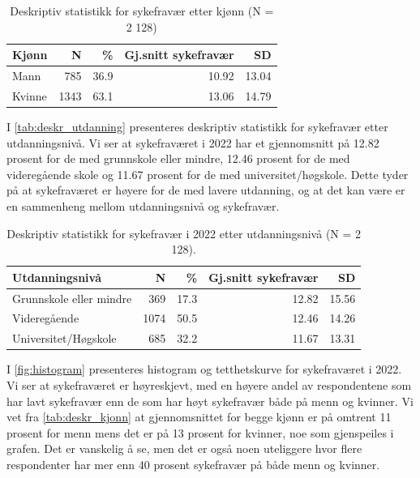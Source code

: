 \documentclass[
  12pt,
  a4paper,
  DIV=11,
  numbers=noendperiod]{scrartcl}
\begin{document}
\begin{table}[ht]
\centering
\begin{tabular}{lrrrr}
\toprule
Kjønn   & N   & \%   & Gj.snitt sykefravær & SD    \\
\midrule
Mann    & 785 & 36.9 & 10.92               & 13.04 \\
Kvinne  & 1343 & 63.1 & 13.06               & 14.79 \\
\bottomrule
\end{tabular}
\caption{Deskriptiv statistikk for sykefravær etter kjønn (N = 2 128)}
\label{tab:deskr_kjonn}
\end{table}

I \autoref{tab:deskr_utdanning} presenteres deskriptiv statistikk for
sykefravær etter utdanningsnivå. Vi ser at sykefraværet i 2022 har et
gjennomsnitt på 12.82 prosent for de med grunnskole eller mindre, 12.46
prosent for de med videregående skole og 11.67 prosent for de med
universitet/høgskole. Dette tyder på at sykefraværet er høyere for de
med lavere utdanning, og at det kan være er en sammenheng mellom
utdanningsnivå og sykefravær.

\begin{table}[ht]
\centering
\begin{tabular}{lrrrr}
\toprule
Utdanningsnivå                & N   & \%   & Gj.snitt sykefravær & SD    \\
\midrule
Grunnskole eller mindre       & 369 & 17.3 & 12.82               & 15.56 \\
Videregående                   &1074 & 50.5 & 12.46               & 14.26 \\
Universitet/Høgskole           & 685 & 32.2 & 11.67               & 13.31 \\
\bottomrule
\end{tabular}
\caption{Deskriptiv statistikk for sykefravær i 2022 etter utdanningsnivå (N = 2 128).}
\label{tab:deskr_utdanning}
\end{table}

I \autoref{fig:histogram} presenteres histogram og tetthetskurve for
sykefraværet i 2022. Vi ser at sykefraværet er høyreskjevt, med en
høyere andel av respondentene som har lavt sykefravær enn de som har
høyt sykefravær både på menn og kvinner. Vi vet fra
\autoref{tab:deskr_kjonn} at gjennomsnittet for begge kjønn er på
omtrent 11 prosent for menn mens det er på 13 prosent for kvinner, noe
som gjenspeiles i grafen. Det er vanskelig å se, men det er også noen
uteliggere hvor flere respondenter har mer enn 40 prosent sykefravær på
både menn og kvinner.
\end{document}

